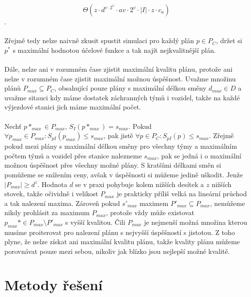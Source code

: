 $$
  \Theta{(z \cdot d^{v \cdot 2^v} \cdot av \cdot 2^v \cdot |I| \cdot z \cdot c_a)}
$$
.
\\
\\
Zřejmě tedy nelze naivně zkusit spustit simulaci pro každý plán $p \in P_C$, držet si $p^*$ s maximální hodnotou účelové funkce a tak najít nejkvalitnější plán.
\\
\\
Dále, nelze ani v rozumném čase zjistit maximální kvalitu plánu, protože ani nelze v rozumném čase zjistit maximální možnou úspěšnost.
Uvažme množinu plánů $P_{max} \subseteq P_C$, obsahující pouze plány s maximální délkou směny $d_{max} \in D$ a uvažme sitauci kdy máme dostatek záchranných týmů i vozidel,
takže na každé výjezdové stanici jich máme maximální počet.
\\
\\
Nechť $p*_{max} \in P_{max}$, $S_{I}(p*_{max}) = s_{max}$.
Pokud $\forall p_{max} \in P_{max} \colon S_{pI}(p_{max}) \leq s_{max}$, pak jistě $\forall p \in P_C \colon S_{pI}(p) \leq s_{max}$.
Zřejmě pokud mezi plány s maximální délkou směny pro všechny týmy a maximálním počtem týmů a vozidel přes stanice nalezneme $s_{max}$,
pak se jedná i o maximální možnou úspěšnost přes všechny možné plány. S kratšími délkami směn si pomůžeme se snížením ceny, avšak v úspěšnosti si můžeme jedině uškodit.
Jenže $|P_{max}| \geq d^z$. Hodnota $d$ se v praxi pohybuje kolem nižších desítek a $z$ nižších stovek,
takže očividně i velikost $P_{max}$ je prakticky příliš velká na lineární průchod a tak nalezení maxima.
Zároveň pokud $s'_{max}$ maximem $P'_{max} \subseteq P_{max}$, nemůžeme nikdy prohlásit za maximum $P_{max}$, protože vždy může existovat $p_{max}* \in P_{max} \setminus P'_{max}$ s vyšší kvalitou.
Čili $P_{max}$ je nejmenší možná množina kterou musíme proiterovat pro nalezení plánu s nejvyšší úspěšností s jistotou.
Z toho plyne, že nelze získat ani maximální kvalitu plánu, takže kvality plánu můžeme porovnávat pouze mezi sebou, nikoliv jak blízko jsou nejlepší možné kvalitě.

\section{Metody řešení}

